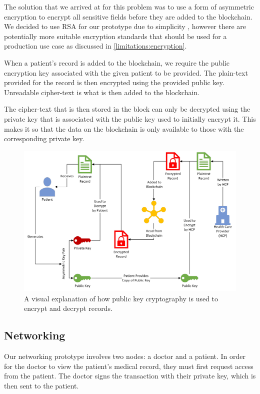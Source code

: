 \documentclass{article}
\begin{document}
The solution that we arrived at for this problem was to use a form of asymmetric encryption to encrypt all sensitive fields before they are added to the blockchain. We decided to use RSA for our prototype due to simplicity \cite{menezes_van_oorschot_vanstone_2001}, however there are potentially more suitable encryption standards that should be used for a production use case as discussed in \ref{limitations:encryption}. %

When a patient's record is added to the blockchain, we require the public encryption key associated with the given patient to be provided. The plain-text provided for the record is then encrypted using the provided public key. Unreadable cipher-text is what is then added to the blockchain.

The cipher-text that is then stored in the block can only be decrypted using the private key that is associated with the public key used to initially encrypt it. This makes it so that the data on the blockchain is only available to those with the corresponding private key.

\begin{figure}[h]
\centering
\includegraphics[width=\textwidth]{images/4990_encryption_structure.png}
\caption{A visual explanation of how public key cryptography is used to encrypt and decrypt records.}
\label{fig:encryption_decryption}
\end{figure}

\subsection{Networking}
\label{networking}
Our networking prototype involves two nodes: a doctor and a patient. In order for the doctor to view the patient's medical record, they must first request access from the patient. The doctor signs the transaction with their private key, which is then sent to the patient.
\end{document}
